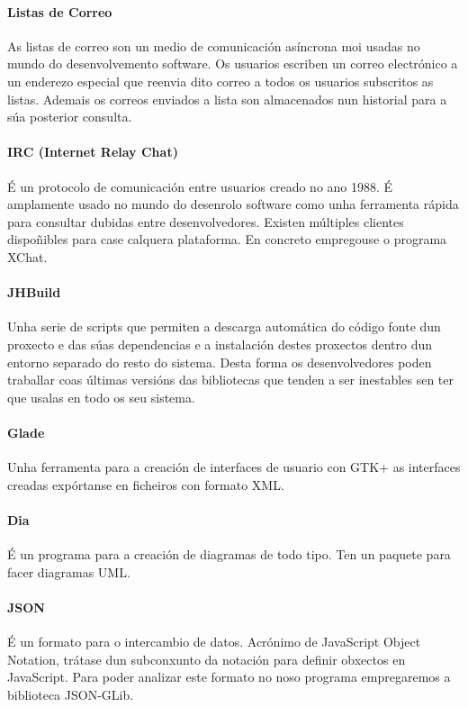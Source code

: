  \paragraph{Listas de Correo} As listas de correo son un medio de comunicación asíncrona moi usadas no mundo do desenvolvemento software. Os usuarios escriben un correo electrónico a un enderezo especial que reenvia dito correo a todos os usuarios subscritos as listas. Ademais os correos enviados a lista son almacenados nun historial para a súa posterior consulta.

 \paragraph{IRC (Internet Relay Chat)} É un protocolo de comunicación entre usuarios creado no ano 1988. É amplamente usado no mundo do desenrolo software como unha ferramenta rápida para consultar dubidas entre desenvolvedores. Existen múltiples clientes dispoñibles para case calquera plataforma. En concreto empregouse o programa XChat.

 \paragraph{JHBuild} Unha serie de scripts que permiten a descarga automática do código fonte dun proxecto e das súas dependencias e a instalación destes proxectos dentro dun entorno separado do resto do sistema. Desta forma os desenvolvedores poden traballar coas últimas versións das bibliotecas que tenden a ser inestables sen ter que usalas en todo os seu sistema.

\paragraph{Glade} Unha ferramenta para a creación de interfaces de usuario con GTK+ as interfaces creadas expórtanse en ficheiros con formato XML.

\paragraph{Dia} É un programa para a creación de diagramas de todo tipo. Ten un paquete para facer diagramas UML.

\paragraph{JSON} É un formato para o intercambio de datos. Acrónimo de JavaScript Object Notation, trátase dun subconxunto da notación para definir obxectos en JavaScript. Para poder analizar este formato no noso programa empregaremos a biblioteca JSON-GLib.


